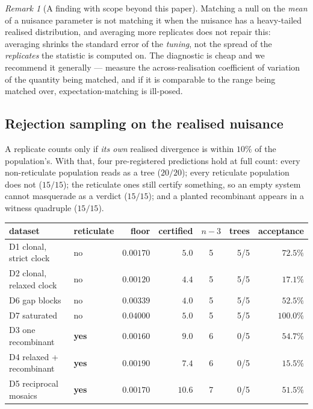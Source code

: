\documentclass[11pt,a4paper]{article}
\theoremstyle{definition}
\theoremstyle{remark}
\newtheorem{remark}{Remark}[section]
\begin{document}
\begin{remark}[A finding with scope beyond this paper]
Matching a null on the \emph{mean} of a nuisance parameter is not matching it
when the nuisance has a heavy-tailed realised distribution, and averaging more
replicates does not repair this: averaging shrinks the standard error of the
\emph{tuning}, not the spread of the \emph{replicates} the statistic is computed
on. The diagnostic is cheap and we recommend it generally --- measure the
across-realisation coefficient of variation of the quantity being matched, and if
it is comparable to the range being matched over, expectation-matching is
ill-posed.
\end{remark}

\subsection{Rejection sampling on the realised nuisance}\label{sec:rejection}

A replicate counts only if \emph{its own} realised divergence is within $10\%$ of
the population's. With that, four pre-registered predictions hold at full count:
every non-reticulate population reads as a tree ($20/20$); every reticulate
population does not ($15/15$); the reticulate ones still certify something, so an
empty system cannot masquerade as a verdict ($15/15$); and a planted recombinant
appears in a witness quadruple ($15/15$).

\begin{center}\footnotesize
\begin{tabular}{@{}llrrcrr@{}}
\toprule
dataset & reticulate & floor & certified & $n-3$ & trees & acceptance \\
\midrule
D1 clonal, strict clock & no & $0.00170$ & $\mathbf{5.0}$ & 5 & 5/5 & $72.5\%$ \\
D2 clonal, relaxed clock & no & $0.00120$ & $4.4$ & 5 & 5/5 & $17.1\%$ \\
D6 gap blocks & no & $0.00339$ & $4.0$ & 5 & 5/5 & $52.5\%$ \\
D7 saturated & no & $\mathbf{0.04000}$ & $\mathbf{5.0}$ & 5 & 5/5 & $100.0\%$ \\
D3 one recombinant & \textbf{yes} & $0.00160$ & $9.0$ & 6 & 0/5 & $54.7\%$ \\
D4 relaxed + recombinant & \textbf{yes} & $0.00190$ & $7.4$ & 6 & 0/5 & $15.5\%$ \\
D5 reciprocal mosaics & \textbf{yes} & $0.00170$ & $10.6$ & 7 & 0/5 & $51.5\%$ \\
\bottomrule
\end{tabular}
\end{center}
\end{document}

